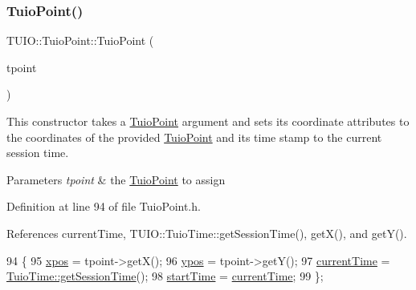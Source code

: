 \subsubsection{\texorpdfstring{Tuio\+Point()}{TuioPoint()}\hspace{0.1cm}{\footnotesize\ttfamily [3/3]}}
{\footnotesize\ttfamily T\+U\+I\+O\+::\+Tuio\+Point\+::\+Tuio\+Point (\begin{DoxyParamCaption}\item[{\hyperlink{class_t_u_i_o_1_1_tuio_point}{Tuio\+Point} $\ast$}]{tpoint }\end{DoxyParamCaption})\hspace{0.3cm}{\ttfamily [inline]}}

This constructor takes a \hyperlink{class_t_u_i_o_1_1_tuio_point}{Tuio\+Point} argument and sets its coordinate attributes to the coordinates of the provided \hyperlink{class_t_u_i_o_1_1_tuio_point}{Tuio\+Point} and its time stamp to the current session time.


\begin{DoxyParams}{Parameters}
{\em tpoint} & the \hyperlink{class_t_u_i_o_1_1_tuio_point}{Tuio\+Point} to assign \\
\hline
\end{DoxyParams}


Definition at line 94 of file Tuio\+Point.\+h.



References current\+Time, T\+U\+I\+O\+::\+Tuio\+Time\+::get\+Session\+Time(), get\+X(), and get\+Y().


\begin{DoxyCode}
94                                       \{
95             \hyperlink{class_t_u_i_o_1_1_tuio_point_a0021f8dfddd05f2a17e713a94f5457e6}{xpos} = tpoint->getX();
96             \hyperlink{class_t_u_i_o_1_1_tuio_point_a89a038775a681166168735dbc95c7779}{ypos} = tpoint->getY();
97             \hyperlink{class_t_u_i_o_1_1_tuio_point_ad04658d52ab78e3e0ddc21584ceaa2ff}{currentTime} = \hyperlink{class_t_u_i_o_1_1_tuio_time_a04e3e660b895b349a26b0364401878b9}{TuioTime::getSessionTime}();
98             \hyperlink{class_t_u_i_o_1_1_tuio_point_ac69cfb9784d5fdc966fba57459d1d8e5}{startTime} = \hyperlink{class_t_u_i_o_1_1_tuio_point_ad04658d52ab78e3e0ddc21584ceaa2ff}{currentTime};
99         \};
\end{DoxyCode}
\mbox{\label{class_t_u_i_o_1_1_tuio_point_acbfa3e1e22467fb1fb767dc5c0863057}} 
